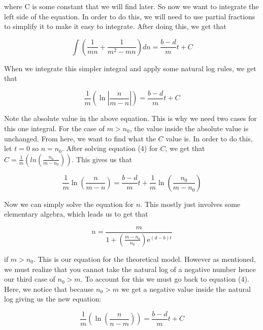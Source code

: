 \documentclass{article}\usepackage[]{graphicx}\usepackage[]{color}
\begin{document}
\noindent where C is some constant that we will find later. So now we want to integrate the left side of the equation. In order to do this, we will need to use partial fractions to simplify it to make it easy to integrate. After doing this, we get that 

\begin{equation}
\int\left(\frac{1}{mn}+\frac{1}{m^2-mn}\right)dn = \frac{b-d}{m} t + C
\end{equation}

\noindent When we integrate this simpler integral and apply some natural log rules, we get that 

\begin{equation}
\frac{1}{m}\left(\ln\left|\frac{n}{m-n}\right|\right) = \frac{b-d}{m} t + C
\end{equation}

\noindent Note the absolute value in the above equation. This is why we need two cases for this one integral. For the case of \(m > n_0\), the value inside the absolute value is unchanged. From here, we want to find what the \(C\) value is. In order to do this, let \(t=0\) so \(n=n_0\). After solving equation (4) for \(C\), we get that \(C = \frac{1}{m}(ln(\frac{n_0}{m-n_0}))\). This gives us that 

\begin{equation}
\frac{1}{m} \ln\left(\frac{n}{m-n}\right) = \frac{b-d}{m}t + \frac{1}{m}\ln\left(\frac{n_0}{m-n_0}\right)
\end{equation}

\noindent Now we can simply solve the equation for \(n\). This mostly just involves some elementary algebra, which leads us to get that 

\begin{equation}
n = \frac{m}{1+\left(\frac{m-n_0}{n_0}\right)\mathrm{e}^{(d-b)t}}
\end{equation}

\noindent if \(m > n_0\). This is our equation for the theoretical model. However as mentioned, we must realize that you cannot take the natural log of a negative number hence our third case of \(n_0 >m\). To account for this we must go back to equation (4). Here, we notice that because \(n_0 > m\) we get a negative value inside the natural log giving us the new equation:

\begin{equation}
\frac{1}{m}\left(\ln\left(\frac{n}{n-m}\right)\right) = \frac{b-d}{m} t + C
\end{equation}
\end{document}
